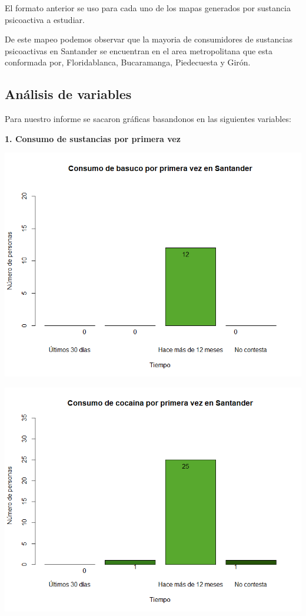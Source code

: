 \documentclass[
]{article}
\begin{document}
\hfill\break

El formato anterior se uso para cada uno de los mapas generados por
sustancia psicoactiva a estudiar.

De este mapeo podemos observar que la mayoria de consumidores de
sustancias psicoactivas en Santander se encuentran en el area
metropolitana que esta conformada por, Floridablanca, Bucaramanga,
Piedecuesta y Girón.

\subsection{Análisis de variables}\label{anuxe1lisis-de-variables}

Para nuestro informe se sacaron gráficas basandonos en las siguientes
variables:

\textbf{1. Consumo de sustancias por primera vez}

\includegraphics{images/basuco 1 santander.png}

\includegraphics{images/cocaina 1 santander.png}
\end{document}
